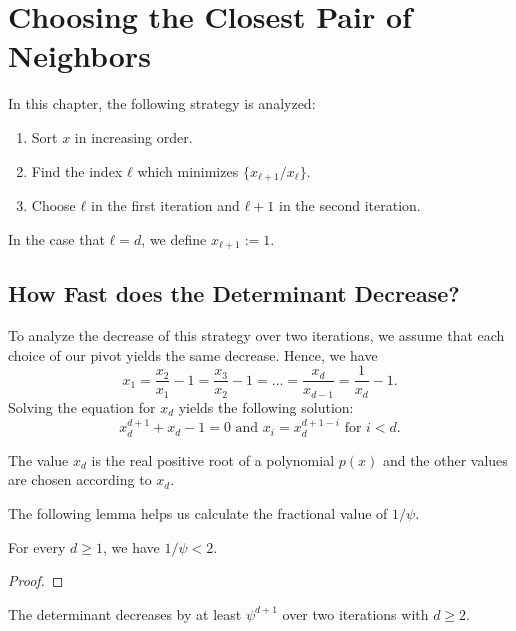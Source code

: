 \chapter{Choosing the Closest Pair of Neighbors}

In this chapter, the following strategy is analyzed:

\begin{enumerate}
  \item Sort $x$ in increasing order.
  \item Find the index $ℓ$ which minimizes $\{x_{ℓ+1}/x_ℓ\}$.
  \item Choose $ℓ$ in the first iteration and $ℓ + 1$ in the second iteration.
\end{enumerate}

In the case that $ℓ = d$, we define $x_{ℓ + 1} := 1$.

\section{How Fast does the Determinant Decrease?}

To analyze the decrease of this strategy over two iterations,
we assume that each choice of our pivot yields the same decrease.
Hence, we have
\begin{equation}
  x_1 = \frac{x_2}{x_1} - 1 = \frac{x_3}{x_2} - 1 = \dots = \frac{x_d}{x_{d-1}} = \frac{1}{x_d} - 1.
\end{equation}
Solving the equation for $x_d$ yields the following solution:
\[
  x_d^{d+1} + x_d - 1 = 0 \text{ and } x_i = x_d^{d+1-i} \text{ for } i < d.
\]

The value $x_d$ is the real positive root of a polynomial $p(x)$
and the other values are chosen according to $x_d$.

The following lemma helps us calculate the fractional value of $1/ψ$.

\begin{lemma}
  For every $d ≥ 1$, we have $1/ψ < 2$.
\end{lemma}

\begin{proof}

\end{proof}

\begin{theorem}
  The determinant decreases by at least $ψ^{d+1}$ over two iterations with $d ≥ 2$.
\end{theorem}


